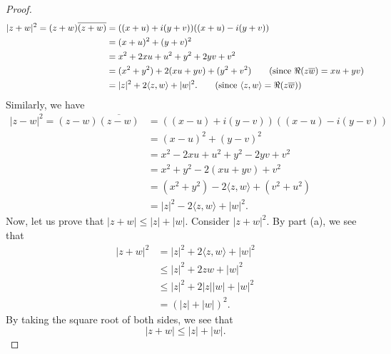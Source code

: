 \documentclass[a4paper]{article}
\begin{document}
\begin{enumerate}
\begin{proof}
                \begin{align*}
                    | z + w  |^{2} = (z+w) \overline{(z+w)} &= ((x+u) + i(y+v)) ((x+u) - i(y+v)) \\
                                                            &= (x+u)^{2} + (y +v)^{2} \\
                                                            &= x^{2} +  2xu + u^{2} + y^{2} + 2yv + v^{2} \\
                                                            &= (x^{2} + y^{2}) + 2 (xu + yv) + (y^{2} + v^{2}) \tag{since \( \Re(z \overline{w}) = xu + yv \)} \\
                                                            &= | z |^{2} + 2 \langle z , w \rangle + | w |^{2}. \tag{since \( \langle z , w \rangle = \Re(z \overline{w}) \)}
                \end{align*} 
                Similarly, we have
                \begin{align*}
                    | z - w  |^{2} = (z-w)\overline{(z-w)} &= ((x-u) + i (y - v)) ((x-u) - i (y - v)) \\
                                                           &= (x-u)^{2} + (y - v)^{2} \\
                                                           &=  x^{2} -2xu + u^{2} + y^{2} -2yv + v^{2} \\
                                                           &= x^{2} + y^{2} -2(xu + yv) + v^{2} \\
                                                           &= (x^{2}  + y^{2}) -2 \langle z , w \rangle + (v^{2} + u^{2}) \\ 
                                                           &= | z |^{2} - 2 \langle z , w \rangle + | w |^{2}.
\end{align*}
Now, let us prove that \( | z + w  | \leq | z  |  + | w |  \). Consider \( | z + w  |^{2} \). By part (a), we see that
\begin{align*}
    | z + w  |^{2} &= | z  |^{2} + 2 \langle z , w \rangle + | w |^{2} \\
                   &\leq | z |^{2} + 2 z  w + | w |^{2} \\ 
                   &\leq | z |^{2} + 2 | z | | w |  + | w |^{2} \\
                   &= (| z |  + | w | )^{2}.
\end{align*}
By taking the square root of both sides, we see that
\[  | z + w  | \leq | z  |  + | w |. \]

\end{proof}
\end{enumerate}
\end{document}
